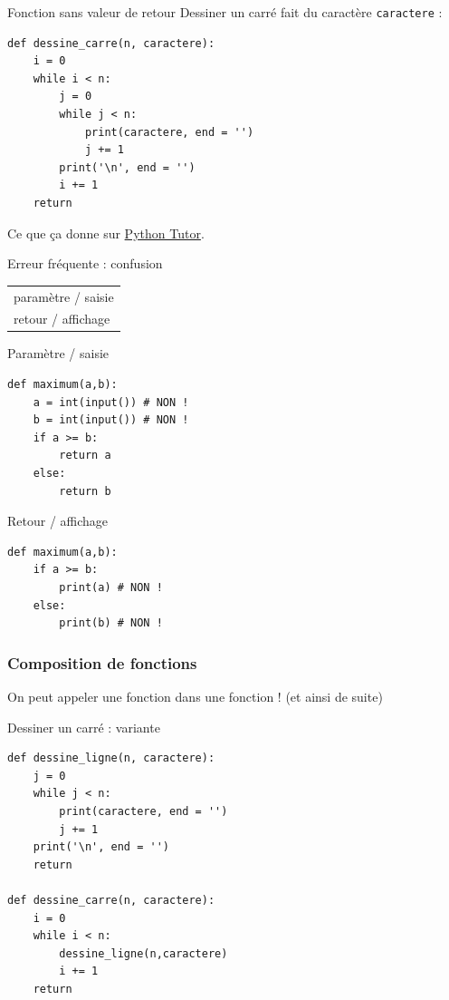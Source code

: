 \documentclass{beamer}
\begin{document}
\begin{frame}[fragile]{Fonction sans valeur de retour}
  Dessiner un carré fait du caractère \texttt{caractere} :
  \pause
\begin{verbatim}
def dessine_carre(n, caractere):
    i = 0
    while i < n:
        j = 0
        while j < n:
            print(caractere, end = '')
            j += 1
        print('\n', end = '')
        i += 1
    return
\end{verbatim}
  \pause
Ce que ça donne sur \href{https://pythontutor.com/}{Python Tutor}.
\end{frame}
\begin{frame}[fragile]{Erreur fréquente : confusion \begin{tabular}{l}paramètre / saisie \\ retour / affichage\end{tabular}}

  \begin{block}{Paramètre / saisie}
\begin{verbatim}
def maximum(a,b):
    a = int(input()) # NON !
    b = int(input()) # NON !
    if a >= b:
        return a
    else:
        return b
\end{verbatim}
  \end{block}
  \pause

  \begin{block}{Retour / affichage}
\begin{verbatim}
def maximum(a,b):
    if a >= b:
        print(a) # NON !
    else:
        print(b) # NON !
\end{verbatim}
  \end{block}
\end{frame}

\begin{frame}
  \frametitle{Composition de fonctions}
  
  On peut appeler une fonction dans une fonction ! (et ainsi de suite)
\end{frame}

\begin{frame}[fragile]{Dessiner un carré : variante}
\begin{verbatim}
def dessine_ligne(n, caractere):
    j = 0
    while j < n:
        print(caractere, end = '')
        j += 1
    print('\n', end = '')
    return

def dessine_carre(n, caractere):
    i = 0
    while i < n:
        dessine_ligne(n,caractere)
        i += 1
    return
\end{verbatim}
\end{frame}
\end{document}
